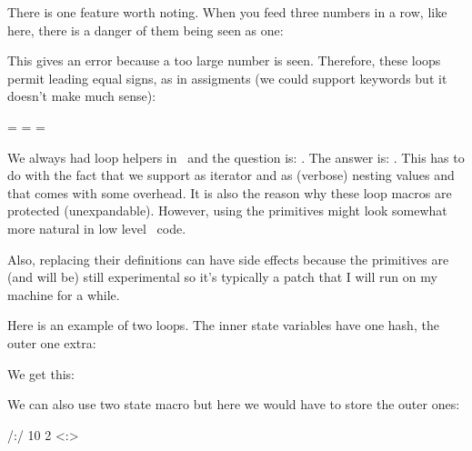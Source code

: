 \blank \start \veryraggedright \tt\tfx \getbuffer \stop \blank

There is one feature worth noting. When you feed three numbers in a row, like here,
there is a danger of them being seen as one:

\starttyping
\expandedloop
  \number{}
  \number{}
  \number{}
  {}
\stoptyping

This gives an error because a too large number is seen. Therefore, these loops
permit leading equal signs, as in assigments (we could support keywords but
it doesn't make much sense):

\starttyping
\expandedloop =\number{} =\number{} =\number{}
\stoptyping

\stopsectionlevel

\startsectionlevel[title=Wrappers]

We always had loop helpers in \CONTEXT\ and the question is: . The answer
is: . This
has to do with the fact that we support  as iterator and  as
(verbose) nesting values and that comes with some overhead. It is also the reason
why these loop macros are protected (unexpandable). However, using the primitives
might look somewhat more natural in low level \TEX\ code.

Also, replacing their definitions can have side effects because the primitives are
(and will be) still experimental so it's typically a patch that I will run on my
machine for a while.

Here is an example of two loops. The inner state variables have one hash, the outer
one extra:

\startbuffer
{}
\stopbuffer

\typebuffer[option=TEX]

We get this:

\startpacked \getbuffer \stoppacked

We can also use two state macro but here we would have to store the outer ones:

\startbuffer
{} {
    /\recursedepth:\recurselevel/
     {10} {2} {
        <\recursedepth:\recurselevel>
    }\par
}
\stopbuffer

